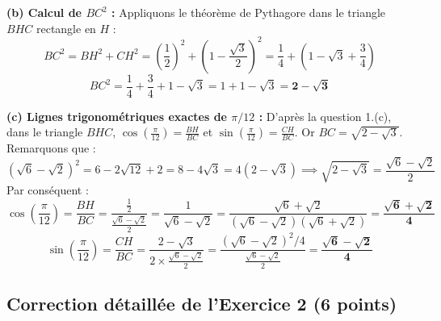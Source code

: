 \documentclass[11pt,a4paper]{article}
\begin{document}
\begin{correctionbox}
\textbf{(b) Calcul de $BC^2$ :}
Appliquons le théorème de Pythagore dans le triangle $BHC$ rectangle en $H$ :
\[
BC^2 = BH^2 + CH^2 = \left(\frac{1}{2}\right)^2 + \left(1 - \frac{\sqrt{3}}{2}\right)^2 = \frac{1}{4} + \left(1 - \sqrt{3} + \frac{3}{4}\right)
\]
\[
BC^2 = \frac{1}{4} + \frac{3}{4} + 1 - \sqrt{3} = 1 + 1 - \sqrt{3} = \mathbf{2 - \sqrt{3}}
\]

\textbf{(c) Lignes trigonométriques exactes de $\pi/12$ :}
D'après la question 1.(c), dans le triangle $BHC$, $\cos\left(\frac{\pi}{12}\right) = \frac{BH}{BC}$ et $\sin\left(\frac{\pi}{12}\right) = \frac{CH}{BC}$.
Or $BC = \sqrt{2 - \sqrt{3}}$. Remarquons que :
\[
(\sqrt{6} - \sqrt{2})^2 = 6 - 2\sqrt{12} + 2 = 8 - 4\sqrt{3} = 4(2 - \sqrt{3}) \implies \sqrt{2 - \sqrt{3}} = \frac{\sqrt{6} - \sqrt{2}}{2}
\]
Par conséquent :
\[
\cos\left(\frac{\pi}{12}\right) = \frac{BH}{BC} = \frac{\frac{1}{2}}{\frac{\sqrt{6}-\sqrt{2}}{2}} = \frac{1}{\sqrt{6} - \sqrt{2}} = \frac{\sqrt{6} + \sqrt{2}}{(\sqrt{6}-\sqrt{2})(\sqrt{6}+\sqrt{2})} = \mathbf{\frac{\sqrt{6} + \sqrt{2}}{4}}
\]
\[
\sin\left(\frac{\pi}{12}\right) = \frac{CH}{BC} = \frac{2 - \sqrt{3}}{2 \times \frac{\sqrt{6}-\sqrt{2}}{2}} = \frac{(\sqrt{6}-\sqrt{2})^2 / 4}{\frac{\sqrt{6}-\sqrt{2}}{2}} = \mathbf{\frac{\sqrt{6} - \sqrt{2}}{4}}
\]
\end{correctionbox}

\vspace{0.4cm}

\subsection*{Correction détaillée de l'Exercice 2 \hfill (6 points)}
\end{document}
